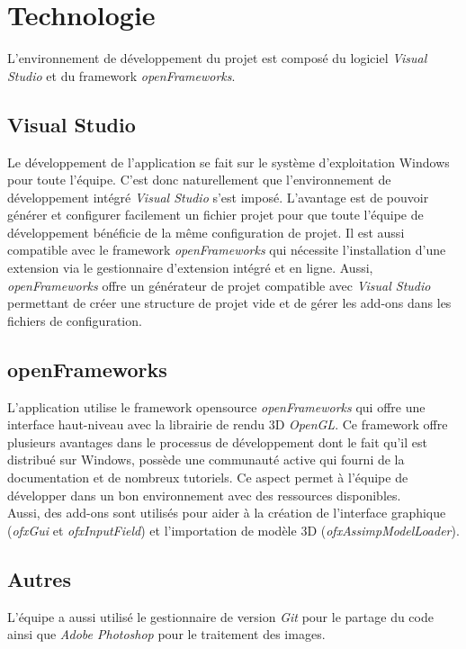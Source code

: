 \section{Technologie}
\label{s:technologie}
L'environnement de développement du projet est composé du logiciel \textit{Visual Studio} et du framework \textit{openFrameworks}.
\subsection{Visual Studio}
Le développement de l'application se fait sur le système d'exploitation Windows pour toute l'équipe.
C'est donc naturellement que l'environnement de développement intégré \textit{Visual Studio} s'est imposé.
L'avantage est de pouvoir générer et configurer facilement un fichier projet pour que toute l'équipe de développement bénéficie de la même configuration de projet.
Il est aussi compatible avec le framework \textit{openFrameworks} qui nécessite l'installation d'une extension via le gestionnaire d'extension intégré et en ligne.
Aussi, \textit{openFrameworks} offre un générateur de projet compatible avec \textit{Visual Studio} permettant de créer une structure de projet vide et de gérer les add-ons dans les fichiers de configuration.

\subsection{openFrameworks}
L'application utilise le framework opensource \textit{openFrameworks} qui offre une interface haut-niveau avec la librairie de rendu 3D \textit{OpenGL}.
Ce framework offre plusieurs avantages dans le processus de développement dont le fait qu'il est distribué sur Windows, possède une communauté active qui fourni de la documentation et de nombreux tutoriels.
Ce aspect permet à l'équipe de développer dans un bon environnement avec des ressources disponibles. \\
\newline
Aussi, des add-ons sont utilisés pour aider à la création de l'interface graphique (\textit{ofxGui} et \textit{ofxInputField}) et l'importation de modèle 3D (\textit{ofxAssimpModelLoader}).

\subsection{Autres}
L'équipe a aussi utilisé le gestionnaire de version \textit{Git} pour le partage du code ainsi que \textit{Adobe Photoshop} pour le traitement des images.
\clearpage
